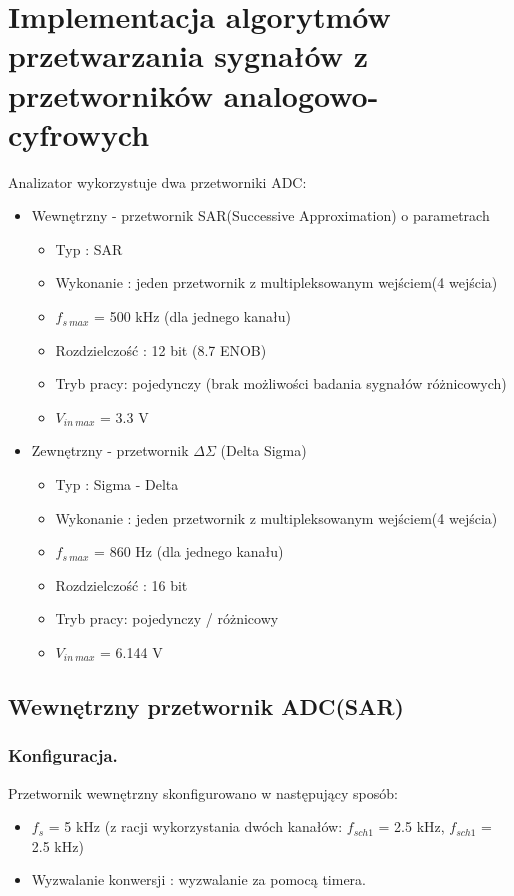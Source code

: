 \section{Implementacja algorytmów przetwarzania sygnałów z przetworników analogowo-cyfrowych}
Analizator wykorzystuje dwa przetworniki ADC:
\begin{itemize}
    \item Wewnętrzny - przetwornik SAR(Successive Approximation) o parametrach
        \begin{itemize}
            \item Typ : SAR
            \item Wykonanie : jeden przetwornik z multipleksowanym wejściem(4 wejścia) 
            \item $f_{s\ max}$ = 500 kHz (dla jednego kanału)
            \item Rozdzielczość : 12 bit (8.7 ENOB)
            \item Tryb pracy: pojedynczy (brak możliwości badania sygnałów różnicowych) 
            \item $V_{in\ max}$ = 3.3 V
        \end{itemize}
        
    \item Zewnętrzny - przetwornik $\Delta\Sigma$ (Delta Sigma)
        \begin{itemize}
            \item Typ : Sigma - Delta
            \item Wykonanie : jeden przetwornik z multipleksowanym wejściem(4 wejścia) 
            \item $f_{s\ max}$ = 860 Hz (dla jednego kanału)
            \item Rozdzielczość : 16 bit 
            \item Tryb pracy: pojedynczy / różnicowy
            \item $V_{in\ max}$ = 6.144 V
        \end{itemize}
\end{itemize}

\subsection{Wewnętrzny przetwornik ADC(SAR)}
\subsubsection{Konfiguracja.}
Przetwornik wewnętrzny skonfigurowano w następujący sposób:
    \begin{itemize}
        \item $f_{s}$ = 5 kHz (z racji wykorzystania dwóch kanałów: $f_{sch1}$ = 2.5 kHz, $f_{sch1}$ = 2.5 kHz)
        \item Wyzwalanie konwersji : wyzwalanie za pomocą timera. 
    \end{itemize}

